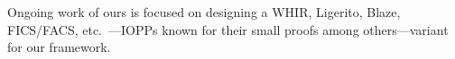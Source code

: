 Ongoing work of ours is focused on designing a WHIR, Ligerito, Blaze, FICS/FACS, etc.\ \cite{whir, Ligerito, blaze, FICS-FACS}---IOPPs known for their small proofs among others---variant for our framework. 



